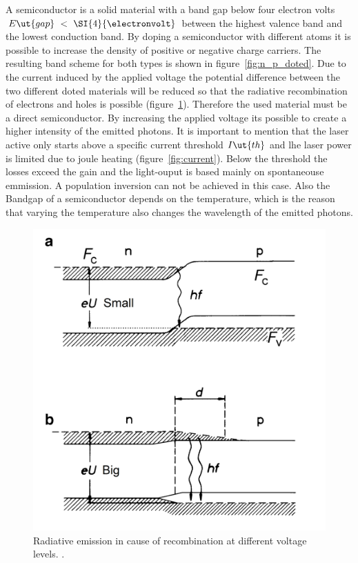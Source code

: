 A semiconductor is a solid material with a band gap below four electron volts
$E\ut{gap}~<~\SI{4}{\electronvolt}$ between the highest valence band and the
lowest conduction band. By doping a semiconductor with different atoms it is
possible to increase the density of positive or negative charge carriers. The
resulting band scheme for both types is shown in figure~\ref{fig:n_p_doted}.
Due to the current induced by the applied voltage the potential difference
between the two different doted materials will be reduced so that the radiative
recombination of electrons and holes is possible (figure~\ref{fig:appliedcurrent}).
Therefore the used material must be a direct semiconductor. By increasing the
applied voltage its possible to create a higher intensity of the emitted photons.
It is important to mention that the laser active only starts above a
specific current threshold $I\ut{th}$ and lhe laser power is limited due to joule
heating (figure~\ref{fig:current}). Below the threshold the losses exceed the gain
and the light-ouput is based mainly on spontaneouse emmission. A population
inversion can not be achieved in this case. Also the Bandgap of a semiconductor
depends on the temperature, which is the reason that varying the temperature
also changes the wavelength of the emitted photons.
\begin{figure}
  \centering
  \includegraphics[width = \textwidth]{Pics/appliedcurrent.png}
  \caption{Radiative emission in cause of recombination at different voltage levels.
  \cite{eichler}.}
  \label{fig:appliedcurrent}
\end{figure}
